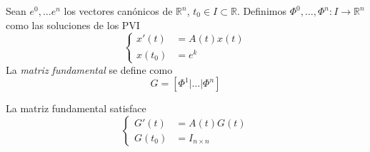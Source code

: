  
\begin{definicion} Sean $e^0, \ldots e^{n}$ los vectores canónicos de $\mathbb{R}^{n}$, $t_0\in I\subset\mathbb{R}$. Definimos $\Phi^{0}, \ldots, \Phi^{n}:I \rightarrow \mathbb{R}^{n}$ como
las soluciones de los PVI
\[
\left\{
\begin{split}
{x}'(t)&=A(t)x(t) \\
x(t_{0})&=e^{k}
\end{split}
\right.
\]
La \emph{matriz fundamental} se define como
$$
G=\left[\Phi^{1}|\ldots| \Phi^{n}\right]
$$
\end{definicion}

\begin{observa} La matriz fundamental satisface
$$
\left\{
\begin{split}
{G}'(t)&=A(t) G(t) \\
G(t_0)&=I_{n\times n}
\end{split}\right.
$$
\end{observa}

